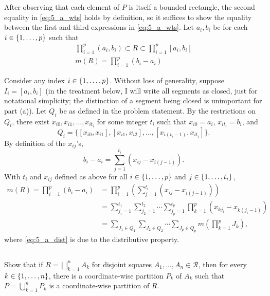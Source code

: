 \documentclass[12pt]{article}
\begin{document}
\noindent\dotfill

After observing that each element of $P$ is itself a bounded rectangle, the second equality in \eqref{eq:5_a_wts} holds by definition, so it suffices to show the equality between the first and third expressions in \eqref{eq:5_a_wts}. 
Let $a_i, b_i$ be for each $i \in \{1, \ldots, p\}$ such that 
\begin{gather*}
  \prod_{i = 1}^{p} (a_i, b_i) \subset R \subset \prod_{i = 1}^{p} [a_i, b_i] \\ 
  m(R) = \prod_{i = 1}^{p} (b_i - a_i)
\end{gather*}

Consider any index $i \in \{1, \ldots, p\}$. 
Without loss of generality, suppose $I_i = [a_i, b_i]$ 
(in the treatment below, I will write all segments as closed, just for notational simplicity; 
the distinction of a segment being closed is unimportant for part (a)). 
Let $Q_i$ be as defined in the problem statement. 
By the restrictions on $Q_i$, there exist $x_{i0}, x_{i1}, \ldots, x_{it_i}$ for some integer $t_i$ such that $x_{i0} = a_i$, $x_{it_i} = b_i$, and 
$$Q_i = \{[x_{i0}, x_{i1}], [x_{i1}, x_{i2}], \ldots, [x_{i(t_i - 1)}, x_{it_i}]\}.$$
By definition of the $x_{ij}$'s,  
$$b_i - a_i = \sum_{j = 1}^{t_i} (x_{ij} - x_{i(j - 1)}).$$
With $t_i$ and $x_{ij}$ defined as above for all $i \in \{1, \ldots, p\}$ and $j \in \{1, \ldots, t_i\}$, 
\begin{align}
  m(R) = \prod_{i = 1}^{p} (b_i - a_i) 
  & = \prod_{i = 1}^{p} (\sum_{j = 1}^{t_i} (x_{ij} - x_{i(j-1)})) \nonumber \\ 
  & = \sum_{j_i = 1}^{t_1}\sum_{j_2 = 1}^{t_2} \cdots \sum_{j_p = 1}^{t_p} \prod_{k = 1}^{p} (x_{kj_i} - x_{k(j_i - 1)}) \label{eq:5_a_dist} \\ 
  & = \sum_{J_1 \in Q_1}\sum_{J_2 \in Q_2} \cdots \sum_{J_p \in Q_p} m(\prod_{k = 1}^{p} J_k), \nonumber
\end{align}
where \eqref{eq:5_a_dist} is due to the distributive property.

\subsection{} 
Show that if $R = \bigsqcup_{k = 1}^{n} A_k$ for disjoint squares $A_1, \ldots, A_n \in \mathcal{R}$, then for every $k \in \{1, \ldots, n\}$, there is a coordinate-wise partition $P_k$ of $A_k$ such that $P = \bigcup_{k = 1}^{n} P_k$ is a coordinate-wise partition of $R$. 

\noindent\dotfill
\end{document}
